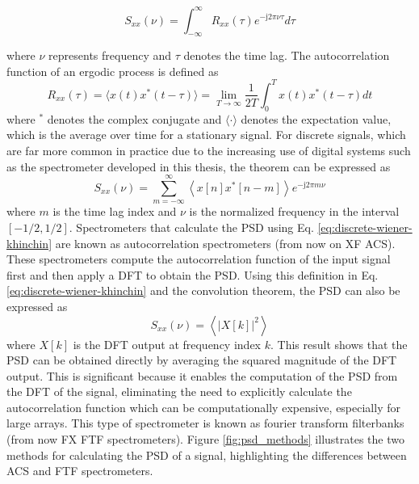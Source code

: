\begin{equation}
	S_{xx}(\nu) = \int_{-\infty}^{\infty} R_{xx}(\tau) e^{- \mathrm{j} 2\pi \nu \tau} d\tau
	\label{eq:continous-wiener-khinchin}
\end{equation}

where $\nu$ represents frequency and $\tau$ denotes the time lag. The autocorrelation function of an ergodic process is defined as \citep{Gubner_2006}
\begin{equation}
	R_{xx}(\tau) =  \langle x(t) x^*(t - \tau)\rangle = \lim_{T \to \infty} \frac{1}{2T} \int_{0}^{T} x(t) x^*(t - \tau) dt
	\label{eq:continous_autocorrelation}
\end{equation}
where $^*$ denotes the complex conjugate and $\langle \cdot \rangle$ denotes the expectation value, which is the average over time for a stationary signal. For discrete signals, which are far more common in practice due to the increasing use of digital systems such as the spectrometer developed in this thesis, the theorem can be expressed as
\begin{equation}
	S_{xx}(\nu) = \sum_{m=-\infty}^{\infty} \left\langle x[n] x^*[n - m] \right\rangle e^{-\mathrm{j}2\pi m \nu}
	\label{eq:discrete-wiener-khinchin}
\end{equation}
where $m$ is the time lag index and $\nu$ is the normalized frequency in the interval $[-1/2,1/2]$. Spectrometers that calculate the PSD using Eq. \ref{eq:discrete-wiener-khinchin} are known as autocorrelation spectrometers (from now on XF ACS). These spectrometers compute the autocorrelation function of the input signal first and then apply a DFT to obtain the PSD. Using this definition in Eq. \ref{eq:discrete-wiener-khinchin} and the convolution theorem, the PSD can also be expressed as
\begin{equation}
	S_{xx}(\nu) = \left\langle |X[k]|^2 \right\rangle
	\label{eq:discrete_psd}
\end{equation}
where $X[k]$ is the DFT output at frequency index $k$. This result shows that the PSD can be obtained directly by averaging the squared magnitude of the DFT output. This is significant because it enables the computation of the PSD from the DFT of the signal, eliminating the need to explicitly calculate the autocorrelation function which can be computationally expensive, especially for large arrays. This type of spectrometer is known as fourier transform filterbanks (from now FX FTF spectrometers). Figure \ref{fig:psd_methods} illustrates the two methods for calculating the PSD of a signal, highlighting the differences between ACS and FTF spectrometers.
